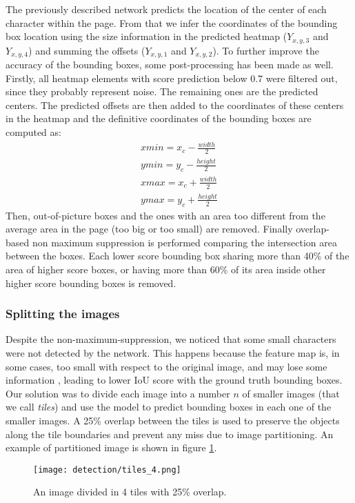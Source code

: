 The previously described network predicts the location of the center of each character within the page. From that we infer the coordinates of the bounding box location using the size information in the predicted heatmap ($Y_{x,y,3}$ and $Y_{x,y,4}$) and summing the offsets ($Y_{x,y,1}$ and $Y_{x,y,2}$). To further improve the accuracy of the bounding boxes, some post-processing has been made as well. Firstly, all heatmap elements with score prediction below 0.7 were filtered out, since they probably represent noise. The remaining ones are the predicted centers. The predicted offsets are then added to the coordinates of these centers in the heatmap and the definitive coordinates of the bounding boxes are computed as:
\begin{eqnarray*}
	xmin=x_c - \frac{width}{2}\\
	ymin= y_c - \frac{height}{2}\\
	xmax=x_c + \frac{width}{2}\\
	ymax=y_c + \frac{height}{2}
\end{eqnarray*}
Then, out-of-picture boxes and the ones with an area too different from the average area in the page (too big or too small) are removed. Finally overlap-based non maximum suppression is performed comparing the intersection area between the boxes. Each lower score bounding box sharing more than 40\% of the area of higher score boxes, or having more than 60\% of its area inside other higher score bounding boxes is removed.\\

\subsubsection{Splitting the images}
\label{sssec:tiling}
\noindent Despite the non-maximum-suppression, we noticed that some small characters were not detected by the network. This happens because the feature map is, in some cases, too small with respect to the original image, and may lose some information \cite{Ozge-Unel2019-jl}, leading to lower IoU score with the ground truth bounding boxes.
Our solution was to divide each image into a number $n$ of smaller images (that we call \textit{tiles}) and use the model to predict bounding boxes in each one of the smaller images. A 25\% overlap between the tiles is used to preserve the objects along the tile boundaries and prevent any miss due to image partitioning. An example of partitioned image is shown in figure \ref{fig:tiles4}.

\begin{figure}
	\centering
	\texttt{[image: detection/tiles\_4.png]}
	\caption{An image divided in 4 tiles with 25\% overlap.}
	\label{fig:tiles4}
\end{figure}

